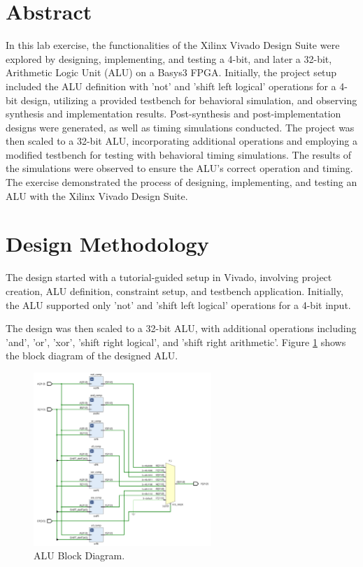 \documentclass[CMPE]{KGCOEReport}
\begin{document}
\maketitle

\section*{Abstract}

In this lab exercise, the functionalities of the Xilinx Vivado Design Suite were explored by designing, implementing, and testing a 4-bit, and later a 32-bit, Arithmetic Logic Unit (ALU) on a Basys3 FPGA. Initially, the project setup included the ALU definition with 'not' and 'shift left logical' operations for a 4-bit design, utilizing a provided testbench for behavioral simulation, and observing synthesis and implementation results. Post-synthesis and post-implementation designs were generated, as well as timing simulations conducted. The project was then scaled to a 32-bit ALU, incorporating additional operations and employing a modified testbench for testing with behavioral timing simulations. The results of the simulations were observed to ensure the ALU's correct operation and timing. The exercise demonstrated the process of designing, implementing, and testing an ALU with the Xilinx Vivado Design Suite.

\section*{Design Methodology}

The design started with a tutorial-guided setup in Vivado, involving project creation, ALU definition, constraint setup, and testbench application. Initially, the ALU supported only 'not' and 'shift left logical' operations for a 4-bit input.

The design was then scaled to a 32-bit ALU, with additional operations including 'and', 'or', 'xor', 'shift right logical', and 'shift right arithmetic'. Figure \ref{fig:alu} shows the block diagram of the designed ALU.

\begin{figure}[H]
    \centering
    \includegraphics[width=0.6\textwidth]{alu.png}
    \caption{ALU Block Diagram.}
    \label{fig:alu}
\end{figure}
\end{document}
